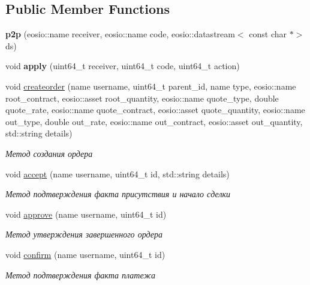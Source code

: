 \subsection*{Public Member Functions}
\begin{DoxyCompactItemize}
\item 
\mbox{\label{classp2p_a5dac3e80d9e970fbc86c4fbaf781f894}} 
{\bfseries p2p} (eosio\+::name receiver, eosio\+::name code, eosio\+::datastream$<$ const char $\ast$$>$ ds)
\item 
\mbox{\label{classp2p_a1ba9938186b683d21e39ae021d7a0a6f}} 
void {\bfseries apply} (uint64\+\_\+t receiver, uint64\+\_\+t code, uint64\+\_\+t action)
\item 
void \mbox{\hyperlink{classp2p_a0b05f55568e9469d33379512b29a116a}{createorder}} (name username, uint64\+\_\+t parent\+\_\+id, name type, eosio\+::name root\+\_\+contract, eosio\+::asset root\+\_\+quantity, eosio\+::name quote\+\_\+type, double quote\+\_\+rate, eosio\+::name quote\+\_\+contract, eosio\+::asset quote\+\_\+quantity, eosio\+::name out\+\_\+type, double out\+\_\+rate, eosio\+::name out\+\_\+contract, eosio\+::asset out\+\_\+quantity, std\+::string details)
\begin{DoxyCompactList}\small\item\em Метод создания ордера \end{DoxyCompactList}\item 
void \mbox{\hyperlink{classp2p_ab7d91c105e22cc794a42cb12d996d0cb}{accept}} (name username, uint64\+\_\+t id, std\+::string details)
\begin{DoxyCompactList}\small\item\em Метод подтверждения факта присутствия и начало сделки \end{DoxyCompactList}\item 
void \mbox{\hyperlink{classp2p_a4562d6493c57589bf2259f119481d39a}{approve}} (name username, uint64\+\_\+t id)
\begin{DoxyCompactList}\small\item\em Метод утверждения завершенного ордера \end{DoxyCompactList}\item 
void \mbox{\hyperlink{classp2p_aa1abaf488133faec3fae6c6c9c9917c2}{confirm}} (name username, uint64\+\_\+t id)
\begin{DoxyCompactList}\small\item\em Метод подтверждения факта платежа \end{DoxyCompactList}\item 
$$
\end{DoxyCompactItemize}
